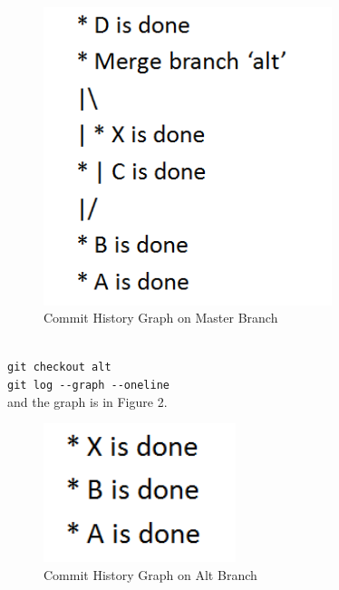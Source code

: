 \documentclass[12pt]{article}
\begin{document}
\begin{figure}[!htb]
    \begin{center}
        \includegraphics[width=0.75\textwidth]{master.png}
    \end{center}
    \caption{Commit History Graph on Master Branch}
\end{figure}

\\
\verb+git checkout alt+\\
\verb+git log --graph --oneline+\\
and the graph is in Figure 2.

\begin{figure}[!htb]
    \begin{center}
        \includegraphics[width=0.5\textwidth]{alt.png}
    \end{center}
    \caption{Commit History Graph on Alt Branch}
\end{figure}
\end{document}
